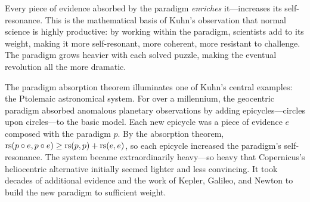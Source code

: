 \begin{interpretation}
Every piece of evidence absorbed by the paradigm \emph{enriches} it---increases
its self-resonance. This is the mathematical basis of Kuhn's observation that
normal science is highly productive: by working within the paradigm, scientists
add to its weight, making it more self-resonant, more coherent, more resistant
to challenge. The paradigm grows heavier with each solved puzzle, making the
eventual revolution all the more dramatic.
\end{interpretation}

\begin{remark}
The paradigm absorption theorem illuminates one of Kuhn's central examples: the
Ptolemaic astronomical system. For over a millennium, the geocentric paradigm
absorbed anomalous planetary observations by adding epicycles---circles upon
circles---to the basic model. Each new epicycle was a piece of evidence $e$
composed with the paradigm $p$. By the absorption theorem, $\mathrm{rs}(p \circ e,
p \circ e) \geq \mathrm{rs}(p, p) + \mathrm{rs}(e, e)$, so each epicycle increased the
paradigm's self-resonance. The system became extraordinarily heavy---so heavy
that Copernicus's heliocentric alternative initially seemed lighter and less
convincing. It took decades of additional evidence and the work of Kepler,
Galileo, and Newton to build the new paradigm to sufficient weight.
\end{remark}

